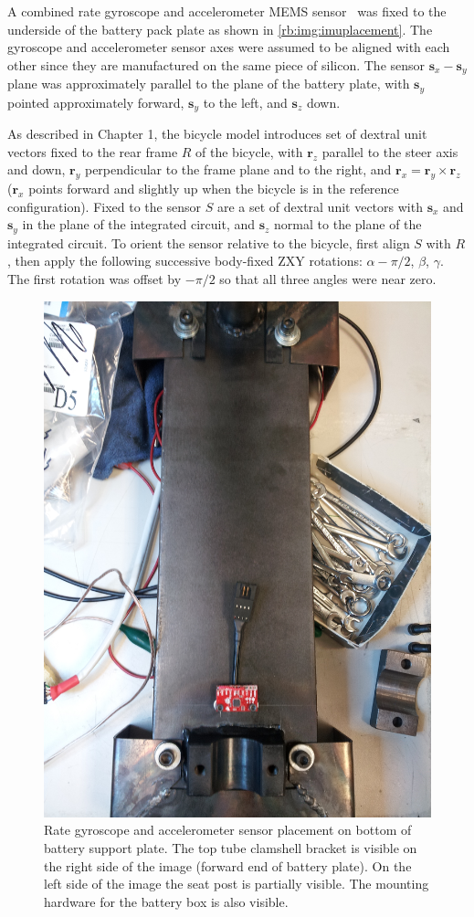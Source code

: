 A combined rate gyroscope and accelerometer MEMS
sensor~\cite{InvensenseMPU6050} was fixed to the underside of the battery pack
plate as shown in \autoref{rb:img:imuplacement}. The gyroscope and
accelerometer sensor axes were assumed to be aligned with each other since they
are manufactured on the same piece of silicon. The sensor $\bm{s}_x-\bm{s}_y$
plane was approximately parallel to the plane of the battery plate, with
$\bm{s}_y$ pointed approximately forward, $\bm{s}_y$ to the left, and
$\bm{s}_z$ down.

As described in Chapter 1, the bicycle model introduces set of dextral unit
vectors fixed to the rear frame $R$ of the bicycle, with $\bm{r}_z$ parallel to
the steer axis and down, $\bm{r}_y$ perpendicular to the frame plane and to the
right, and $\bm{r}_x = \bm{r}_y \times \bm{r}_z$ ($\bm{r}_x$ points forward and
slightly up when the bicycle is in the reference configuration). Fixed to the sensor $S$
are a set of dextral unit vectors with $\bm{s}_x$ and $\bm{s}_y$ in the plane
of the integrated circuit, and $\bm{s}_z$ normal to the plane of the integrated
circuit. To orient the sensor relative to the bicycle, first align $S$ with
$R$, then apply the following successive body-fixed ZXY rotations: $\alpha -
\pi/2$, $\beta$, $\gamma$. The first rotation was offset by $-\pi/2$ so that
all three angles were near zero.

\begin{figure}[ht]
  \centering
  \includegraphics[width=.6\textwidth,angle=90]{images/IMG_20130325_195226.jpg}
  \caption{Rate gyroscope and accelerometer sensor placement on bottom of
  battery support plate. The top tube clamshell bracket is visible on the right side of
the image (forward end of battery plate). On the left side of the image the
seat post is partially visible. The mounting hardware for the battery box is also
visible.}
  \label{rb:img:imuplacement}
\end{figure}

